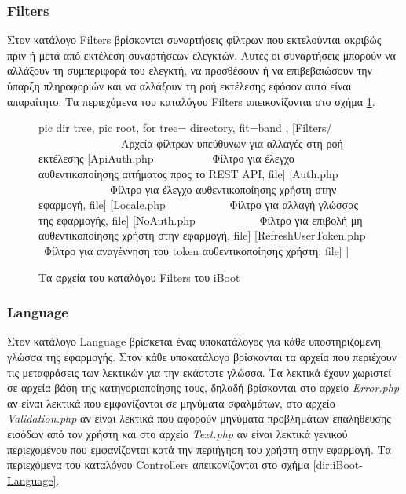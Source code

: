 \subsubsection{Filters} \label{ui:app:filters}
Στον κατάλογο Filters βρίσκονται συναρτήσεις φίλτρων που εκτελούνται ακριβώς πριν ή μετά από εκτέλεση συναρτήσεων ελεγκτών. Αυτές οι συναρτήσεις μπορούν να αλλάξουν τη συμπεριφορά του ελεγκτή, να προσθέσουν ή να επιβεβαιώσουν την ύπαρξη πληροφοριών και να αλλάξουν τη ροή εκτέλεσης εφόσον αυτό είναι απαραίτητο. Τα περιεχόμενα του καταλόγου Filters απεικονίζονται στο σχήμα \ref{dir:iBoot-Filters}.

\begin{figure}
	\centering
	{\footnotesize
		\begin{forest}
			pic dir tree,
			pic root,
			for tree={%
				directory,
				fit=band
			},
			[Filters/ \ \ \ \ \ \ \ \ \ \ \ \ \ \ \ Αρχεία φίλτρων υπεύθυνων για αλλαγές στη ροή εκτέλεσης
				[ApiAuth.php \ \ \ \ \ \ \ \ \ \ Φίλτρο για έλεγχο αυθεντικοποίησης αιτήματος προς το REST API, file]
				[Auth.php \ \ \ \ \ \ \ \ \ \ \ \ \ Φίλτρο για έλεγχο αυθεντικοποίησης χρήστη στην εφαρμογή, file]
				[Locale.php \ \ \ \ \ \ \ \ \ \ \ Φίλτρο για αλλαγή γλώσσας της εφαρμογής, file]
				[NoAuth.php \ \ \ \ \ \ \ \ \ \ \ Φίλτρο για επιβολή μη αυθεντικοποίησης χρήστη στην εφαρμογή, file]
				[RefreshUserToken.php \ Φίλτρο για αναγέννηση του token αυθεντικοποίησης χρήστη, file]
			]
		\end{forest}
	}
	\caption{Τα αρχεία του καταλόγου Filters του iBoot}
	\label{dir:iBoot-Filters}
\end{figure}

\subsubsection{Language} \label{ui:app:language}
Στον κατάλογο Language βρίσκεται ένας υποκατάλογος για κάθε υποστηριζόμενη γλώσσα της εφαρμογής. Στον κάθε υποκατάλογο βρίσκονται τα αρχεία που περιέχουν τις μεταφράσεις των λεκτικών για την εκάστοτε γλώσσα. Τα λεκτικά έχουν χωριστεί σε αρχεία βάση της κατηγοριοποίησης τους, δηλαδή βρίσκονται στο αρχείο \emph{Error.php} αν είναι λεκτικά που εμφανίζονται σε μηνύματα σφαλμάτων, στο αρχείο \emph{Validation.php} αν είναι λεκτικά που αφορούν μηνύματα προβλημάτων επαλήθευσης εισόδων από τον χρήστη και στο αρχείο \emph{Text.php} αν είναι λεκτικά γενικού περιεχομένου που εμφανίζονται κατά την περιήγηση του χρήστη στην εφαρμογή. Τα περιεχόμενα του καταλόγου Controllers απεικονίζονται στο σχήμα \ref{dir:iBoot-Language}.

